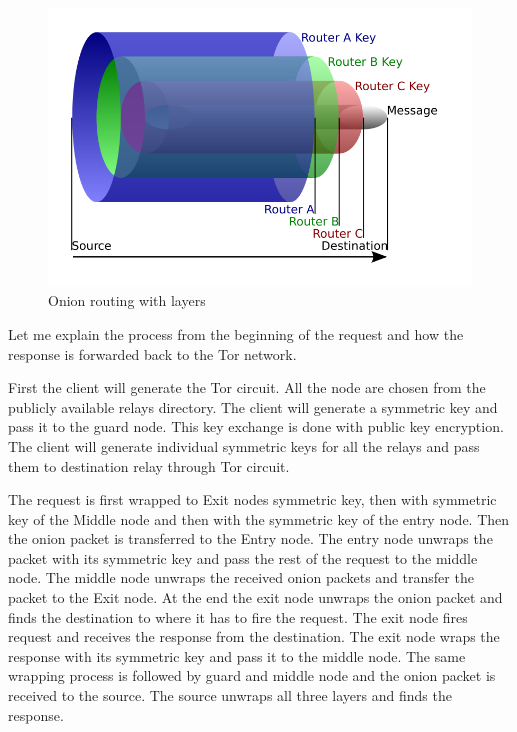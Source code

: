\documentclass{article}
\begin{document}
      \begin{figure}[h!]
        \includegraphics[width=\linewidth]{onion_routing_with_layers.png}
        \caption{Onion routing with layers}
        \label{fig:onion_routing_with_layers}
      \end{figure}

      Let me explain the process from the beginning of the request and how the
      response is forwarded back to the Tor network.

      First the client will generate the Tor circuit. All the node are chosen
      from the publicly available relays directory. The client will generate a
      symmetric key and pass it to the guard node. This key exchange is done
      with public key encryption. The client will generate individual symmetric
      keys for all the relays and pass them to destination relay through Tor
      circuit.

      The request is first wrapped to Exit nodes symmetric key, then with
      symmetric key of the Middle node and then with the symmetric key of the
      entry node. Then the onion packet is transferred to the Entry node. The
      entry node unwraps the packet with its symmetric key and pass the rest of
      the request to the middle node. The middle node unwraps the received
      onion packets and transfer the packet to the Exit node. At the end the
      exit node unwraps the onion packet and finds the destination to where it
      has to fire the request. The exit node fires request and receives the
      response from the destination. The exit node wraps the response with its
      symmetric key and pass it to the middle node. The same wrapping process
      is followed by guard and middle node and the onion packet is received to
      the source. The source unwraps all three layers and finds the response.
\end{document}
